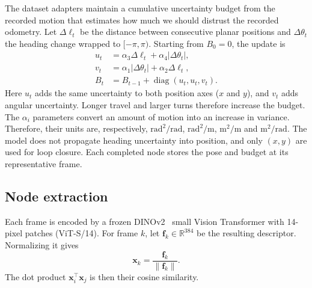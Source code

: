 \documentclass[5p,twocolumn,nonatbib,reversenotenum]{elsarticle}
\begin{document}
The dataset adapters maintain a cumulative uncertainty budget from the recorded motion that estimates how much we should distrust the recorded odometry. Let $\Delta\ell_t$ be the distance between consecutive planar positions and $\Delta\theta_t$ the heading change wrapped to $[-\pi,\pi)$. Starting from $B_0=0$, the update is
\begin{equation}
\label{eq:motion-budget}
\begin{aligned}
    u_t &= \alpha_3\Delta\ell_t+\alpha_4|\Delta\theta_t|,\\
    v_t &= \alpha_1|\Delta\theta_t|+\alpha_2\Delta\ell_t,\\
    B_t &= B_{t-1}+\operatorname{diag}(u_t,u_t,v_t).
\end{aligned}
\end{equation}
Here $u_t$ adds the same uncertainty to both position axes ($x$ and $y$), and $v_t$ adds angular uncertainty. Longer travel and larger turns therefore increase the budget. The \(\alpha_i\) parameters convert an amount of motion into an increase in variance. Therefore, their units are, respectively, $\mathrm{rad}^2/\mathrm{rad}$, $\mathrm{rad}^2/\mathrm{m}$, $\mathrm{m}^2/\mathrm{m}$ and $\mathrm{m}^2/\mathrm{rad}$. The model does not propagate heading uncertainty into position, and only $(x, y)$ are used for loop closure. Each completed node stores the pose and budget at its representative frame.

\subsection{Node extraction}
\label{sec:node-extraction}
Each frame is encoded by a frozen DINOv2~\cite{oquab2024dinov2learningrobustvisual} small Vision Transformer with 14-pixel patches (ViT-S/14). For frame $k$, let $\mathbf{f}_k\in\mathbb{R}^{384}$ be the resulting descriptor. Normalizing it gives
\begin{equation}
    \mathbf{x}_k=\frac{\mathbf{f}_k}{\lVert\mathbf{f}_k\rVert}.
\end{equation}
The dot product $\mathbf{x}_i^\top\mathbf{x}_j$ is then their cosine similarity.
\end{document}
